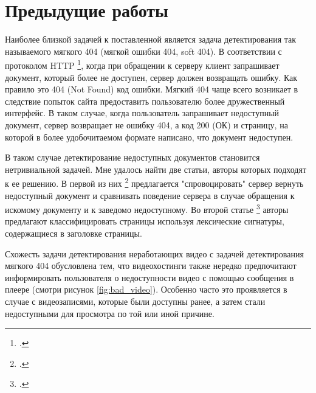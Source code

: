 

\chapter{Предыдущие работы}

Наиболее близкой задачей к поставленной является задача детектирования так называемого мягкого 404 (мягкой ошибки 404, soft 404). В соответствии с протоколом HTTP \footcite{Fielding2014}, когда при обращении к серверу клиент запрашивает документ, который более не доступен, сервер должен возвращать ошибку. Как правило это 404 (Not Found) код ошибки. Мягкий 404 чаще всего возникает в следствие попыток сайта предоставить пользователю более дружественный интерфейс. В таком случае, когда пользователь запрашивает недоступный документ, сервер возвращает не ошибку 404, а код 200 (ОК) и страницу, на которой в более удобочитаемом формате написано, что документ недоступен.

В таком случае детектирование недоступных документов становится нетривиальной задачей. Мне удалось найти две статьи, авторы которых подходят к ее решению. В первой из них \footcite{Bar-Yossef2004} предлагается "спровоцировать" сервер вернуть недоступный документ и сравнивать поведение сервера в случае обращения к искомому документу и к заведомо недоступному. Во второй статье \footcite{Meneses2012} авторы предлагают классифицировать страницы используя лексические сигнатуры, содержащиеся в заголовке страницы.

Схожесть задачи детектирования неработающих видео с задачей детектирования мягкого 404 обусловлена тем, что видеохостинги также нередко предпочитают информировать пользователя о недоступности видео с помощью сообщения в плеере (смотри рисунок \ref{fig:bad_video}). Особенно часто это проявляется в случае с видеозаписями, которые были доступны ранее, а затем стали недоступными для просмотра по той или иной причине.

